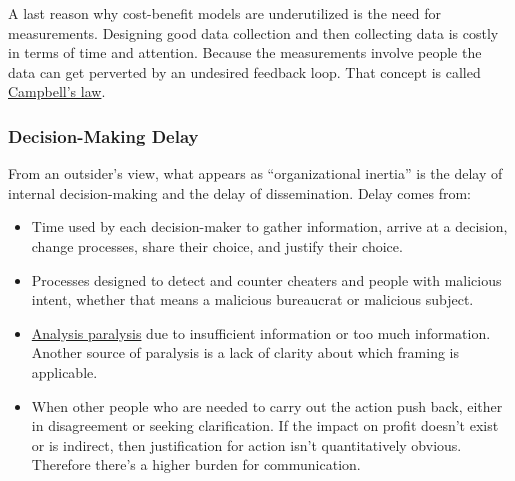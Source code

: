 A last reason why cost-benefit models are underutilized is the need for measurements. Designing good data collection and then collecting data is costly in terms of time and attention. Because the measurements involve people the data can get perverted by an undesired feedback loop. That concept is called \href{https://en.wikipedia.org/wiki/Campbell\%27s_law}{Campbell's law}. 

\subsubsection*{Decision-Making Delay\label{sec:decision-delay}}

From an outsider's view, what appears as ``organizational inertia'' is the delay of internal decision-making and the delay of dissemination. 
Delay comes from:
\begin{itemize}
    \item Time used by each decision-maker to gather information, arrive at a decision, change processes, share their choice, and justify their choice. 
    \item Processes designed to detect and counter cheaters and people with malicious intent, whether that means a malicious bureaucrat or malicious subject. 
\item \href{https://en.wikipedia.org/wiki/Analysis_paralysis}{Analysis paralysis} 
\iftoggle{WPinmargin}{\marginpar{$>$Wikipedia: Analysis paralysis}}{}
due to insufficient information or too much information. Another source  of paralysis is a lack of clarity about which framing is applicable.
\item When other people who are needed to carry out the action push back, either in disagreement or seeking clarification. If the impact on profit doesn't exist or is indirect, then justification for action isn't quantitatively obvious. Therefore there's a higher burden for communication.
\end{itemize}

